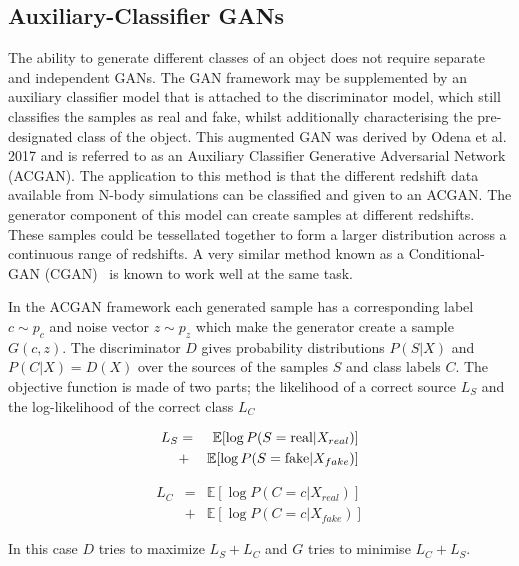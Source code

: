 \documentclass[twocolumn]{article}
\newcommand\EE{\mathbb{E}}
\numberwithin{equation}{section}
\begin{document}
\subsection{Auxiliary-Classifier GANs}
The ability to generate different classes of an object does not require separate and independent GANs. The GAN framework 
may be supplemented by an auxiliary classifier model that is attached to the discriminator model, which still classifies 
the samples as real and fake, whilst additionally characterising the pre-designated class of the object. This augmented 
GAN was derived by Odena et al. 2017 \cite{acgan} and is referred to as an Auxiliary Classifier Generative Adversarial 
Network (ACGAN). The application to this method is that the different redshift data available from N-body simulations can 
be classified and given to an ACGAN. The generator component of this model can create samples at different redshifts. 
These samples could be tessellated together to form a larger distribution across a continuous range of  redshifts. A very 
similar method known as a Conditional-GAN (CGAN)~\cite{cgan} is known to work well at the same task.

In the ACGAN framework each generated sample has a corresponding label $c \sim p_c$ and noise vector $z \sim p_z$ which 
make the generator create a sample $G(c, z)$. The discriminator $D$ gives probability distributions $P(S|X)$ and $P(C|X) 
= D(X)$ over the sources of the samples $S$ and class labels $C$. The objective function is made of two parts; the 
likelihood of a correct source $L_S$ and the log-likelihood of the correct class $L_C$

\begin{eqnarray}
    L_S &=& \EE [\log P(S = \textup{real} | X_{real})] \nonumber \\
        &+& \EE [\log P(S = \textup{fake} | X_{fake})]
\end{eqnarray}

\begin{eqnarray}
    L_C &=& \EE [\log P(C = c | X_{real})] \nonumber \\
        &+& \EE [\log P(C = c | X_{fake})]
\end{eqnarray}

In this case $D$ tries to maximize $L_S + L_C$ and $G$ tries to minimise $L_C + L_S$.



\end{document}
